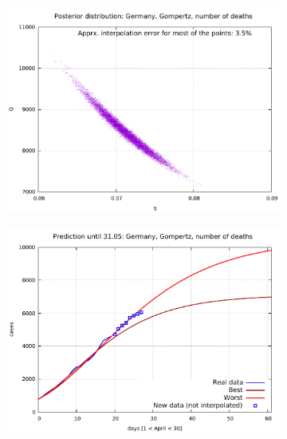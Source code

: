 \documentclass[8pt]{article}
\begin{document}
\begin{figure}[h!]
  \centering
  \begin{subfigure}[b]{0.5\linewidth}
  \includegraphics[width=\linewidth]{../de_g_d/posterior.pdf}
  \end{subfigure}
  \begin{subfigure}[b]{0.48\linewidth}
    \includegraphics[width=\linewidth]{../de_g_d/prediction.pdf}
  \end{subfigure}
  \begin{subfigure}[b]{0.48\linewidth}

\end{subfigure}
\end{figure}
\end{document}
